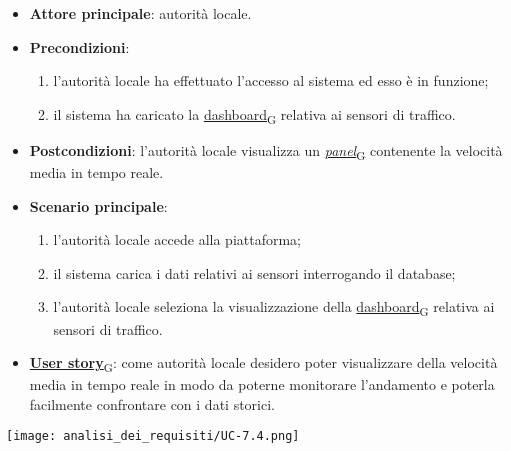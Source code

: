 \begin{itemize}
	\item \textbf{Attore principale}: autorità locale.
	\item \textbf{Precondizioni}:
	      \begin{enumerate}
		      \item l'autorità locale ha effettuato l'accesso al sistema ed esso è in funzione;
		      \item il sistema ha caricato la \href{https://7last.github.io/docs/rtb/documentazione-interna/glossario\#dashboard}{dashboard\textsubscript{G}} relativa ai sensori di traffico.
	      \end{enumerate}
	\item \textbf{Postcondizioni}: l'autorità locale visualizza un \href{https://7last.github.io/docs/rtb/documentazione-interna/glossario\#panel}{\textit{panel}\textsubscript{G}} contenente la velocità media in tempo reale.
	\item \textbf{Scenario principale}:
	      \begin{enumerate}
		      \item l'autorità locale accede alla piattaforma;
		      \item il sistema carica i dati relativi ai sensori interrogando il database;
		      \item l'autorità locale seleziona la visualizzazione della \href{https://7last.github.io/docs/rtb/documentazione-interna/glossario\#dashboard}{dashboard\textsubscript{G}} relativa ai sensori di traffico.
	      \end{enumerate}
	\item \href{https://7last.github.io/docs/rtb/documentazione-interna/glossario\#user-story}{\textbf{User story}\textsubscript{G}}:
	      come autorità locale desidero poter visualizzare della velocità media in tempo reale in modo da poterne monitorare l'andamento
	      e poterla facilmente confrontare con i dati storici.
\end{itemize}
\begin{center}
	\texttt{[image: analisi\_dei\_requisiti/UC-7.4.png]}
\end{center}

\newpage

